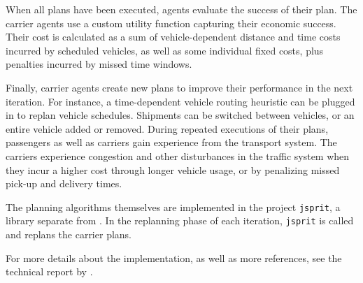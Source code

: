 When all plans have been executed, agents evaluate the success of their plan. The carrier agents use a custom 
utility function capturing their economic success. Their cost is calculated as a sum of vehicle-dependent 
distance and time costs incurred by scheduled vehicles, as well as some individual fixed costs, plus penalties 
incurred by missed time windows.

Finally, carrier agents create new plans to improve their performance in the next iteration. For instance, a time-dependent vehicle routing heuristic can be plugged in to replan vehicle schedules. Shipments can be switched between vehicles, or an entire vehicle added or removed.
During repeated executions of their plans, passengers as well as carriers gain experience from the transport system. The carriers experience congestion and other disturbances in the traffic system when they incur a higher cost through longer vehicle usage, or by penalizing missed pick-up and delivery times.

The planning algorithms themselves are implemented in the project \lstinline|jsprit|, a library separate from .
In the replanning phase of each iteration, \lstinline|jsprit| is called and replans the carrier plans.

For more details about the implementation, as well as more references, see the technical report by \citet[][]{ZilskeEtAl_TechRep_VSP_2012}.


